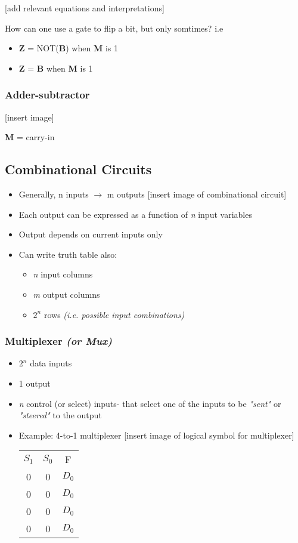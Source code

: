 \documentclass{article}
\begin{document}
[add relevant equations and interpretations]

How can one use a gate to flip a bit, but only somtimes? i.e
\begin{itemize}
\item \textbf{Z} = NOT(\textbf{B}) when \textbf{M} is 1
\item \textbf{Z} = \textbf{B} when \textbf{M} is 1
\end{itemize}

\subsubsection{Adder-subtractor}

[insert image]

\textbf{M} = carry-in

\subsection{Combinational Circuits}
\begin{itemize}
\item Generally, n inputs $\rightarrow$ m outputs [insert image of combinational circuit]
\item Each output can be expressed as a function of \textit{n} input variables
\item Output depends on current inputs only
\item Can write truth table also:
\begin{itemize}
\item \textit{n} input columns
\item \textit{m} output columns
\item $2^{n}$ rows \textit{(i.e. possible input combinations)}
\end{itemize}
\end{itemize}

\subsubsection{Multiplexer \textit{(or Mux)}}

\begin{itemize}
\item $2^{n}$ data inputs
\item 1 output
\item \textit{n} control (or select) inputs- that select one of the inputs to be \textit{"sent"} or \textit{"steered"} to the output
\item Example: 4-to-1 multiplexer [insert image of logical symbol for multiplexer] \\
\begin{tabular}{ c c c }
$S_{1}$&$S_{0}$&F\\
0&0&$D_{0}$\\
0&0&$D_{0}$\\
0&0&$D_{0}$\\
0&0&$D_{0}$\\
\end{tabular}
\end{itemize}
\end{document}
